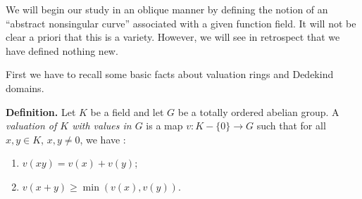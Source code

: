 {We will begin our study in an oblique manner by defining the notion of an \textquotedblleft{}abstract nonsingular curve\textquotedblright{} associated with a given function field. It will not be clear a priori that this is a variety. However, we will see in retrospect that we have defined nothing new.

First we have to recall some basic facts about valuation rings and Dedekind domains.

\smallskip
\noindent\hypertarget{err-I-6-valuation}{}\textbf{Definition.} Let $K$ be a field and let $G$ be a totally ordered abelian group. A \emph{valuation of $K$ with values in $G$} is a map $v\colon K-\{0\}\to G$ such that for all $x,y\in K$, $x,y\ne0$, we have :
\begin{enumerate}[label=(\arabic*),leftmargin=2.4em,nosep]
\item $v(xy)=v(x)+v(y)$;
\item $v(x+y)\ge\min(v(x),v(y))$.
\end{enumerate}}
